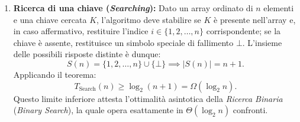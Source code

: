 \begin{enumerate}
  \item \textbf{Ricerca di una chiave (\textit{Searching}):}
  Dato un array ordinato di $n$ elementi e una chiave cercata $K$, l'algoritmo deve stabilire se $K$ è presente nell'array e, in caso affermativo, restituire l'indice $i \in \{1, 2, \dots, n\}$ corrispondente; se la chiave è assente, restituisce un simbolo speciale di fallimento $\bot$. L'insieme delle possibili risposte distinte è dunque:
  \begin{equation}
    S(n) = \{1, 2, \dots, n\} \cup \{\bot\} \implies |S(n)| = n + 1.
  \end{equation}
  Applicando il teorema:
  \begin{equation}
    T_{\text{Search}}(n) \ge \log_2(n + 1) = \Omega(\log_2 n).
  \end{equation}
  Questo limite inferiore attesta l'ottimalità asintotica della \textit{Ricerca Binaria} (\textit{Binary Search}), la quale opera esattamente in $\Theta(\log_2 n)$ confronti.


\end{enumerate}

